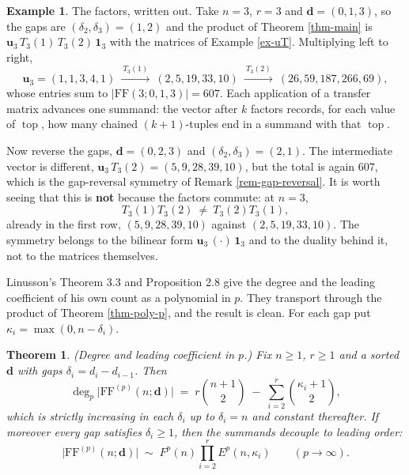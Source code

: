 \documentclass[11pt, a4paper, abstract=yes]{scrartcl}
\theoremstyle{definition}
\newtheorem{mexample}[definition]{Example}
\theoremstyle{remark}
\theoremstyle{plain}
\newtheorem{theorem}[definition]{Theorem}
\newcommand{\vek}[1]{\boldsymbol{#1}}
\newcommand{\tp}{\operatorname{top}}
\begin{document}
\begin{mexample}
The factors, written out. Take \(n=3\), \(r=3\) and \(\vek d=(0,1,3)\), so the gaps are
\((\delta_2,\delta_3)=(1,2)\) and the product of Theorem \ref{thm-main} is \(\vek u_3\,T_3(1)\,T_3(2)\,\vek1_3\)
with the matrices of Example \ref{ex-uT}. Multiplying left to right,
\[
  \vek u_3=(1,1,3,4,1)
  \ \xrightarrow{\ T_3(1)\ }\ (2,5,19,33,10)
  \ \xrightarrow{\ T_3(2)\ }\ (26,59,187,266,69),
\]
whose entries sum to \(\lvert\mathrm{FF}(3;0,1,3)\rvert=607\). Each application of a transfer matrix
advances one summand: the vector after \(k\) factors records, for each value of \(\tp\), how many
chained \((k+1)\)-tuples end in a summand with that \(\tp\).

Now reverse the gaps, \(\vek d=(0,2,3)\) and \((\delta_2,\delta_3)=(2,1)\). The intermediate vector is
different, \(\vek u_3\,T_3(2)=(5,9,28,39,10)\), but the total is again \(607\), which is the
gap-reversal symmetry of Remark \ref{rem-gap-reversal}. It is worth seeing that this is \textbf{not} because
the factors commute: at \(n=3\),
\[
  T_3(1)T_3(2)\ \ne\ T_3(2)T_3(1),
\]
already in the first row, \((5,9,28,39,10)\) against \((2,5,19,33,10)\). The symmetry belongs to the
bilinear form \(\vek u_3\,(\cdot)\,\vek1_3\) and to the duality behind it, not to the matrices
themselves.
\label{ex-factors}
\end{mexample}

Linusson's Theorem 3.3 and Proposition 2.8 give the degree and the leading coefficient of his own
count as a polynomial in \(p\). They transport through the product of Theorem \ref{thm-poly-p}, and the
result is clean. For each gap put \(\kappa_i=\max(0,n-\delta_i)\).

\begin{theorem}
(\emph{Degree and leading coefficient in \(p\).}) Fix \(n\ge1\), \(r\ge1\) and a sorted \(\vek d\) with
gaps \(\delta_i=d_i-d_{i-1}\). Then
\begin{equation}\label{eq:degree-in-p}
  \deg_p\lvert\mathrm{FF}^{(p)}(n;\vek d)\rvert
   \;=\; r\binom{n+1}{2}\;-\;\sum_{i=2}^{r}\binom{\kappa_i+1}{2},
\end{equation}
which is strictly increasing in each \(\delta_i\) up to \(\delta_i=n\) and constant thereafter. If
moreover every gap satisfies \(\delta_i\ge1\), then the summands decouple to leading order:
\begin{equation}\label{eq:lc-in-p}
  \lvert\mathrm{FF}^{(p)}(n;\vek d)\rvert\;\sim\;F^p(n)\prod_{i=2}^{r}E^p(n,\kappa_i)
  \qquad(p\to\infty).
\end{equation}
\label{thm-asymptotics-p}
\end{theorem}
\end{document}
